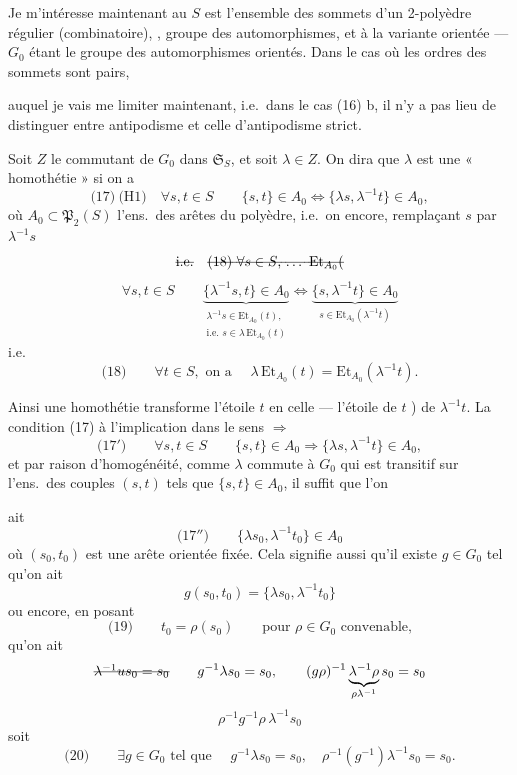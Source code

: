 \documentclass[11pt,a4paper]{article}
\begin{document}
Je m'intéresse maintenant au  $S$ est l'ensemble des sommets
d'un 2-polyèdre  régulier (combinatoire), ,  groupe des automorphismes, et à la
variante orientée — $G_0$ étant  le groupe des automorphismes
orientés. Dans le cas où les ordres des sommets sont pairs,

auquel je vais me limiter maintenant, i.e.\ dans le cas (16) b, il n'y a pas
lieu de distinguer entre antipodisme et celle d'antipodisme
strict.

Soit $Z$ le commutant de $G_0$ dans $\mathfrak{S}_S$,  et soit $\lambda \in Z$. On dira que $\lambda$ est une
« homothétie » si on a
\[
\text{(17)}\ \text{(H1)} \quad \forall s,t \in S \qquad
\{s,t\} \in A_0 \iff \{\lambda s, \lambda^{-1} t\} \in A_0 ,
\]
où $A_0 \subset \mathfrak{P}_2(S)$ l'ens.\ des arêtes du polyèdre, i.e.\ on
encore, remplaçant  $s$ par $\lambda^{-1}s$
\[
\text{\struck{i.e.}}\quad
\text{\struck{(18) $\forall s \in S$, \dots\ $\mathrm{Et}_{A_0}($}}
\]
\[
\forall s,t \in S \qquad
\underbrace{\{\lambda^{-1}s, t\} \in A_0}_{\substack{\lambda^{-1}s \in \mathrm{Et}_{A_0}(t),\\ \text{i.e. } s \in \lambda\, \mathrm{Et}_{A_0}(t)}}
\iff
\underbrace{\{s, \lambda^{-1}t\} \in A_0}_{s \in \mathrm{Et}_{A_0}(\lambda^{-1}t)}
\]
i.e.
\[
\text{(18)} \qquad \forall t \in S, \text{ on a } \quad
\lambda\, \mathrm{Et}_{A_0}(t) = \mathrm{Et}_{A_0}(\lambda^{-1} t) .
\]

Ainsi une homothétie transforme l'étoile  $t$ en celle
 — l'étoile de $t$ 
\ill{}) de $\lambda^{-1} t$. La condition (17)  \ill{} à
l'implication dans le sens $\Rightarrow$
\[
\text{(17$'$)} \qquad \forall s,t \in S \qquad
\{s,t\} \in A_0 \Rightarrow \{\lambda s, \lambda^{-1} t\} \in A_0 ,
\]
et par raison d'homogénéité, comme $\lambda$ commute à $G_0$ qui est transitif
sur l'ens.\ des couples $(s,t)$ tels que $\{s,t\} \in A_0$, il suffit que l'on

ait
\[
\text{(17$''$)} \qquad \{\lambda s_0, \lambda^{-1} t_0\} \in A_0
\]
où $(s_0, t_0)$ est une arête orientée fixée. Cela signifie aussi qu'il existe
$g \in G_0$ tel qu'on ait
\[
g(s_0, t_0) = \{\lambda s_0, \lambda^{-1} t_0\}
\]
ou encore, en posant
\[
\text{(19)} \qquad t_0 = \rho(s_0) \qquad \text{pour } \rho \in G_0 \text{ convenable,}
\]
qu'on ait
\[
\text{\struck{$\lambda^{-1} u s_0 = s_0$}} \qquad
g^{-1} \lambda s_0 = s_0 ,
\qquad
(g\rho)^{-1} \underbrace{\lambda^{-1} \rho}_{\rho \lambda^{-1}} s_0 = s_0
\]
\[
\rho^{-1} g^{-1} \rho\, \lambda^{-1} s_0
\]
soit
\[
\text{(20)} \qquad \exists g \in G_0 \text{ tel que } \quad
g^{-1} \lambda s_0 = s_0 , \quad
\rho^{-1}(g^{-1}) \lambda^{-1} s_0 = s_0 .
\]
\end{document}
